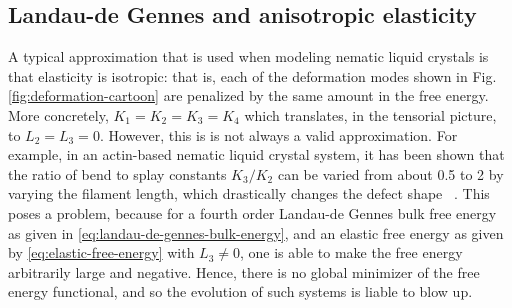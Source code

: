 \documentclass[reqno]{article}
\begin{document}
  \subsection{Landau-de Gennes and anisotropic elasticity} \label{anisotropic-elasticity}
  A typical approximation that is used when modeling nematic liquid crystals is
  that elasticity is isotropic: that is, each of the deformation modes shown in
  Fig. \ref{fig:deformation-cartoon} are penalized by the same amount in the
  free energy.
  More concretely, $K_1 = K_2 = K_3 = K_4$ which translates, in the tensorial
  picture, to $L_2 = L_3 = 0$.
  However, this is is not always a valid approximation.
  For example, in an actin-based nematic liquid crystal system, it has been shown that the
  ratio of bend to splay constants $K_3 / K_2$ can be varied from about 0.5 to 2
  by varying the filament length, which drastically changes the defect shape
  ~\cite{zhang_interplay_2018-1}.
  This poses a problem, because for a fourth order Landau-de Gennes bulk free
  energy as given in \ref{eq:landau-de-gennes-bulk-energy}, and an elastic free
  energy as given by \ref{eq:elastic-free-energy} with $L_3 \neq 0$, one is able
  to make the free energy arbitrarily large and negative.
  Hence, there is no global minimizer of the free energy functional, and so the
  evolution of such systems is liable to blow up.
\end{document}
